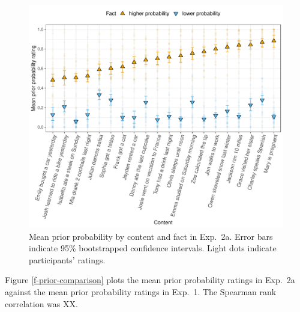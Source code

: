 \documentclass[11pt,fleqn]{article}
\newcommand{\6}{\mbox{$[\hspace*{-.6mm}[$}}
\newcommand{\9}{\mbox{$]\hspace*{-.6mm}]$}}
\begin{document}
\begin{figure}[h!]
\centering
\includegraphics[width=.75\paperwidth]{../../results/1-prior/graphs/prior-ratings}

\caption{Mean prior probability by content and fact in Exp.~2a. Error bars indicate 95\% bootstrapped confidence intervals. Light dots indicate participants' ratings.} 
\label{f-prior-2a}
\end{figure}

Figure \ref{f-prior-comparison} plots the mean prior probability ratings in Exp.~2a against the mean prior probability ratings in Exp.~1. The Spearman rank correlation was XX. 
\end{document}
